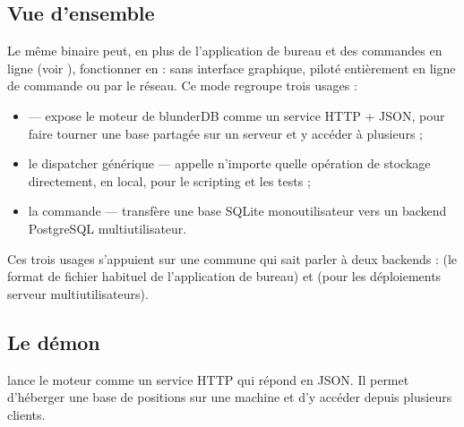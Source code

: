 \documentclass[letterpaper,10pt,french]{sphinxmanual}
\begin{document}
\subsection{Vue d’ensemble}
\label{\detokenize{mode_headless:vue-d-ensemble}}
\sphinxAtStartPar
Le même binaire  peut, en plus de l’application de bureau et des
commandes en ligne (voir {\hyperref[\detokenize{cli:cli}]{}}), fonctionner en  :
sans interface graphique, piloté entièrement en ligne de commande ou par le
réseau. Ce mode regroupe trois usages :
\begin{itemize}
\item {} 
\sphinxAtStartPar
{}  — expose le moteur de blunderDB comme un service
HTTP + JSON, pour faire tourner une base partagée sur un serveur et y
accéder à plusieurs ;

\item {} 
\sphinxAtStartPar
le dispatcher générique  — appelle n’importe quelle opération de
stockage directement, en local, pour le scripting et les tests ;

\item {} 
\sphinxAtStartPar
la commande  — transfère une base SQLite mono\sphinxhyphen{}utilisateur vers
un backend PostgreSQL multi\sphinxhyphen{}utilisateur.

\end{itemize}

\sphinxAtStartPar
Ces trois usages s’appuient sur une  commune qui sait
parler à deux backends :  (le format de fichier  habituel de
l’application de bureau) et  (pour les déploiements serveur
multi\sphinxhyphen{}utilisateurs).


\subsection{Le démon }
\label{\detokenize{mode_headless:le-demon-serve}}\label{\detokenize{mode_headless:headless-serve}}
\sphinxAtStartPar
{} lance le moteur comme un service HTTP qui répond en JSON.
Il permet d’héberger une base de positions sur une machine et d’y accéder
depuis plusieurs clients.
\end{document}
